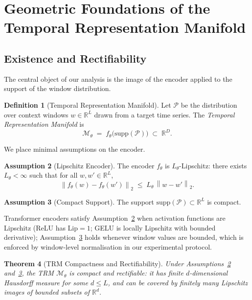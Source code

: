 \documentclass[12pt]{article}
\newtheorem{theorem}{Theorem}[section]
\theoremstyle{definition}
\newtheorem{definition}[theorem]{Definition}
\newtheorem{assumption}[theorem]{Assumption}
\theoremstyle{remark}
\newcommand{\R}{\mathbb{R}}
\newcommand{\Pset}{\mathcal{P}}
\newcommand{\norm}[1]{\left\lVert #1 \right\rVert}
\newcommand{\trm}{\mathcal{M}_\theta}
\newcommand{\Lip}{\mathrm{Lip}}
\begin{document}
\section{Geometric Foundations of the Temporal Representation Manifold}
\label{sec:manifold_theory}

\subsection{Existence and Rectifiability}

The central object of our analysis is the image of the encoder applied to
the support of the window distribution.

\begin{definition}[Temporal Representation Manifold]
\label{def:trm}
Let $\Pset$ be the distribution over context windows $w \in \R^L$ drawn from
a target time series. The \emph{Temporal Representation Manifold} is
\[
  \trm \;=\; f_\theta\!\bigl(\mathrm{supp}(\Pset)\bigr) \;\subset\; \R^D.
\]
\end{definition}

We place minimal assumptions on the encoder.

\begin{assumption}[Lipschitz Encoder]
\label{asm:lipschitz}
The encoder $f_\theta$ is $L_\theta$-Lipschitz: there exists $L_\theta < \infty$
such that for all $w, w' \in \R^L$,
\[
  \norm{f_\theta(w) - f_\theta(w')}_2 \;\leq\; L_\theta\,\norm{w - w'}_2.
\]
\end{assumption}

\begin{assumption}[Compact Support]
\label{asm:compact}
The support $\mathrm{supp}(\Pset) \subset \R^L$ is compact.
\end{assumption}

Transformer encoders satisfy Assumption~\ref{asm:lipschitz} when activation
functions are Lipschitz (ReLU has $\Lip = 1$; GELU is locally Lipschitz with
bounded derivative); Assumption~\ref{asm:compact} holds whenever window
values are bounded, which is enforced by window-level normalisation in our
experimental protocol.

\begin{theorem}[TRM Compactness and Rectifiability]
\label{thm:rectifiability}
Under Assumptions~\ref{asm:lipschitz} and~\ref{asm:compact}, the TRM
$\trm$ is compact and rectifiable: it has finite $d$-dimensional Hausdorff
measure for some $d \leq L$, and can be covered by finitely many Lipschitz
images of bounded subsets of $\R^d$.
\end{theorem}
\end{document}
